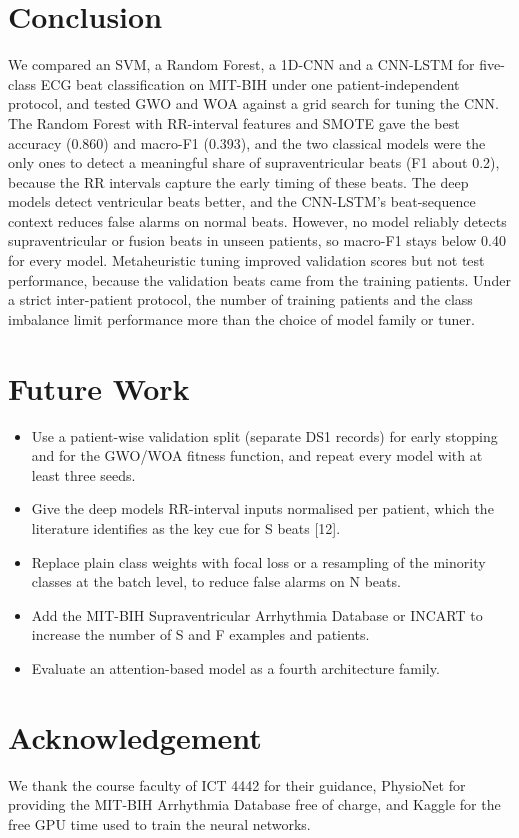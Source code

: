 \documentclass[11pt,a4paper]{article}
\begin{document}
\section{Conclusion}
We compared an SVM, a Random Forest, a 1D-CNN and a CNN-LSTM for five-class ECG beat classification on MIT-BIH under one patient-independent protocol, and tested GWO and WOA against a grid search for tuning the CNN. The Random Forest with RR-interval features and SMOTE gave the best accuracy (0.860) and macro-F1 (0.393), and the two classical models were the only ones to detect a meaningful share of supraventricular beats (F1 about 0.2), because the RR intervals capture the early timing of these beats. The deep models detect ventricular beats better, and the CNN-LSTM's beat-sequence context reduces false alarms on normal beats. However, no model reliably detects supraventricular or fusion beats in unseen patients, so macro-F1 stays below 0.40 for every model. Metaheuristic tuning improved validation scores but not test performance, because the validation beats came from the training patients. Under a strict inter-patient protocol, the number of training patients and the class imbalance limit performance more than the choice of model family or tuner.

\section{Future Work}
\begin{itemize}
\item Use a patient-wise validation split (separate DS1 records) for early stopping and for the GWO/WOA fitness function, and repeat every model with at least three seeds.
\item Give the deep models RR-interval inputs normalised per patient, which the literature identifies as the key cue for S beats [12].
\item Replace plain class weights with focal loss or a resampling of the minority classes at the batch level, to reduce false alarms on N beats.
\item Add the MIT-BIH Supraventricular Arrhythmia Database or INCART to increase the number of S and F examples and patients.
\item Evaluate an attention-based model as a fourth architecture family.
\end{itemize}

\section*{Acknowledgement}
We thank the course faculty of ICT 4442 for their guidance, PhysioNet for providing the MIT-BIH Arrhythmia Database free of charge, and Kaggle for the free GPU time used to train the neural networks.
\end{document}
